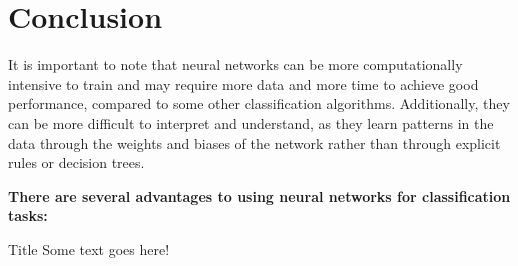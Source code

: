 \section{Conclusion}
\label{chap:conclusion}
It is important to note that neural networks can be more 
computationally intensive to train and may require more data and 
more time to achieve good performance, compared to some other
 classification algorithms. Additionally, they can be more difficult
  to interpret and understand, as they learn patterns in the data 
  through the weights and biases of 
the network rather than through explicit rules or decision trees.


\textbf{There are several advantages to using neural networks for classification tasks:
}
\begin{theorem}[label={theorem:label}]{Title}
    Some text goes here!  
\end{theorem}

\newpage